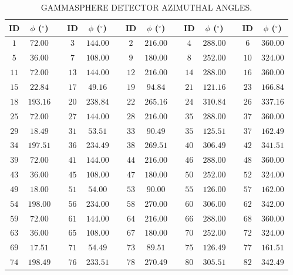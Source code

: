 \begin{table}
\caption{GAMMASPHERE DETECTOR AZIMUTHAL ANGLES.\label{tbl:app1-gs-detectors}}
\begin{center}
\begin{tabular}{|c|c|c|c|c|c|c|c|c|c|c|c|c|c|}
\hline
\hline
ID & $\phi$ ($^{\circ}$) & & ID & $\phi$ ($^{\circ}$) & & ID & $\phi$ ($^{\circ}$) & & ID & $\phi$ ($^{\circ}$) & & ID & $\phi$ ($^{\circ}$)\\

\hline{}  $1$& $72.00$& &  $3$&$144.00$& &  $2$&$216.00$& &  $4$&$288.00$& &  $6$&$360.00$\\
\hline{}  $5$& $36.00$& &  $7$&$108.00$& &  $9$&$180.00$& &  $8$&$252.00$& & $10$&$324.00$\\
\hline{} $11$& $72.00$& & $13$&$144.00$& & $12$&$216.00$& & $14$&$288.00$& & $16$&$360.00$\\
\hline{} $15$& $22.84$& & $17$& $49.16$& & $19$& $94.84$& & $21$&$121.16$& & $23$&$166.84$\\
\hline{} $18$&$193.16$& & $20$&$238.84$& & $22$&$265.16$& & $24$&$310.84$& & $26$&$337.16$\\
\hline{} $25$& $72.00$& & $27$&$144.00$& & $28$&$216.00$& & $35$&$288.00$& & $37$&$360.00$\\ 
\hline{} $29$& $18.49$& & $31$& $53.51$& & $33$& $90.49$& & $35$&$125.51$& & $37$&$162.49$\\
\hline{} $34$&$197.51$& & $36$&$234.49$& & $38$&$269.51$& & $40$&$306.49$& & $42$&$341.51$\\
\hline{} $39$& $72.00$& & $41$&$144.00$& & $44$&$216.00$& & $46$&$288.00$& & $48$&$360.00$\\ 
\hline{} $43$& $36.00$& & $45$&$108.00$& & $47$&$180.00$& & $50$&$252.00$& & $52$&$324.00$\\ 
\hline{} $49$& $18.00$& & $51$& $54.00$& & $53$& $90.00$& & $55$&$126.00$& & $57$&$162.00$\\
\hline{} $54$&$198.00$& & $56$&$234.00$& & $58$&$270.00$& & $60$&$306.00$& & $62$&$342.00$\\
\hline{} $59$& $72.00$& & $61$&$144.00$& & $64$&$216.00$& & $66$&$288.00$& & $68$&$360.00$\\
\hline{} $63$& $36.00$& & $65$&$108.00$& & $67$&$180.00$& & $70$&$252.00$& & $72$&$324.00$\\
\hline{} $69$& $17.51$& & $71$& $54.49$& & $73$& $89.51$& & $75$&$126.49$& & $77$&$161.51$\\
\hline{} $74$&$198.49$& & $76$&$233.51$& & $78$&$270.49$& & $80$&$305.51$& & $82$&$342.49$\\

\end{tabular}
\end{center}
\end{table}

